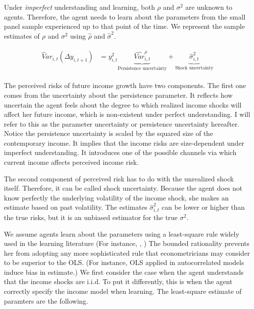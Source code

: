 \documentclass[12pt,notitlepage,onecolumn,aps,pra]{article}
\begin{document}
Under \emph{imperfect} understanding and learning, both \(\rho\) and
\(\sigma^2\) are unknown to agents. Therefore, the agent needs to learn
about the parameters from the small panel sample experienced up to that
point of the time. We represent the sample estimates of \(\rho\) and
\(\sigma^2\) using \(\widehat \rho\) and \(\hat{\sigma}^2\).

\begin{eqnarray}
\begin{split}
\widehat Var_{i,t}(\Delta y_{i,t+1}) & = y_{i,t}^2 \underbrace{\widehat{Var}^{\rho}_{i,t}}_{\text{Persistence uncertainty}} + \underbrace{\hat{\sigma}^2_{i,t}}_{\text{Shock uncertainty}}
\end{split}
\end{eqnarray}

The perceived risks of future income growth have two components. The
first one comes from the uncertainty about the persistence parameter. It
reflects how uncertain the agent feels about the degree to which
realized income shocks will affect her future income, which is
non-existent under perfect understanding. I will refer to this as the
parameter uncertainty or persistence uncertainty hereafter. Notice the
persistence uncertainty is scaled by the squared size of the
contemporary income. It implies that the income risks are size-dependent
under imperfect understanding. It introduces one of the possible
channels via which current income affects perceived income risk.

The second component of perceived risk has to do with the unrealized
shock itself. Therefore, it can be called shock uncertainty. Because the
agent does not know perfectly the underlying volatility of the income
shock, she makes an estimate based on past volatility. The estimates
\(\hat{\sigma}^2_{i,t}\) can be lower or higher than the true risks, but
it is an unbiased estimator for the true \(\sigma^2\).

We assume agents learn about the parameters using a least-square rule
widely used in the learning literature (For instance,
\cite{evans2012learning}, \cite{malmendier2015learning}) The bounded
rationality prevents her from adopting any more sophisticated rule that
econometricians may consider to be superior to the OLS. (For instance,
OLS applied in autocorrelated models induce bias in estimate.) We first
consider the case when the agent understands that the income shocks are
i.i.d. To put it differently, this is when the agent correctly specify
the income model when learning. The least-square estimate of paramters
are the following.
\end{document}
